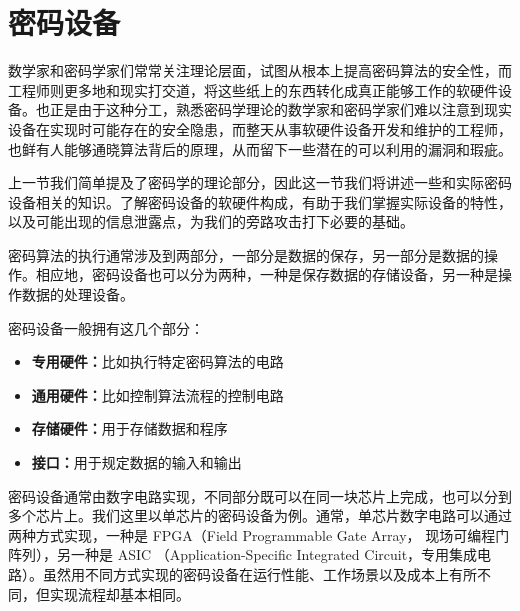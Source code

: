 


\section{密码设备} %
数学家和密码学家们常常关注理论层面，试图从根本上提高密码算法的安全性，而工程师则更多地和现实打交道，将这些纸上的东西转化成真正能够工作的软硬件设备。也正是由于这种分工，熟悉密码学理论的数学家和密码学家们难以注意到现实设备在实现时可能存在的安全隐患，而整天从事软硬件设备开发和维护的工程师，也鲜有人能够通晓算法背后的原理，从而留下一些潜在的可以利用的漏洞和瑕疵。

上一节我们简单提及了密码学的理论部分，因此这一节我们将讲述一些和实际密码设备相关的知识。了解密码设备的软硬件构成，有助于我们掌握实际设备的特性，以及可能出现的信息泄露点，为我们的旁路攻击打下必要的基础。

密码算法的执行通常涉及到两部分，一部分是数据的保存，另一部分是数据的操作。相应地，密码设备也可以分为两种，一种是保存数据的存储设备，另一种是操作数据的处理设备。

\vspace*{0.5\baselineskip}

密码设备一般拥有这几个部分：

\begin{itemize}
\item \textbf{专用硬件：}比如执行特定密码算法的电路
\item \textbf{通用硬件：}比如控制算法流程的控制电路
\item \textbf{存储硬件：}用于存储数据和程序
\item \textbf{接口：}用于规定数据的输入和输出
\end{itemize}

\vspace*{0.5\baselineskip}

密码设备通常由数字电路实现，不同部分既可以在同一块芯片上完成，也可以分到多个芯片上。我们这里以单芯片的密码设备为例。通常，单芯片数字电路可以通过两种方式实现，一种是 FPGA（Field Programmable Gate Array， 现场可编程门阵列），另一种是 ASIC （Application-Specific Integrated Circuit，专用集成电路）。虽然用不同方式实现的密码设备在运行性能、工作场景以及成本上有所不同，但实现流程却基本相同。

